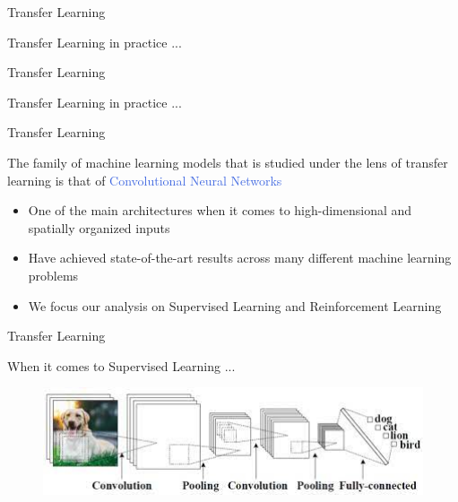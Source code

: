 \documentclass{beamer}
\begin{document}
\begin{frame}{Transfer Learning}
	
	\bigskip
	Transfer Learning in practice ...
	\bigskip
	

\end{frame}


\begin{frame}{Transfer Learning}
	
	\bigskip
	Transfer Learning in practice ...
	\bigskip
	

\end{frame}

\begin{frame}{Transfer Learning}

	The family of machine learning models that is studied under the lens of transfer learning is that of \textcolor{RoyalBlue}{Convolutional Neural Networks}

	\begin{itemize}
		\item One of the main architectures when it comes to high-dimensional and spatially organized inputs
		\item Have achieved state-of-the-art results across many different machine learning problems
		\item We focus our analysis on Supervised Learning and Reinforcement Learning
	\end{itemize}


\end{frame}

\begin{frame}{Transfer Learning}
	
	When it comes to Supervised Learning ...
	\bigskip	
	\begin{figure}
		\includegraphics[width=1\textwidth]{figures/dogo}
	\end{figure}


\end{frame}
\end{document}
